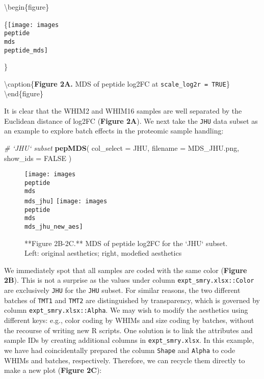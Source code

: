\documentclass[]{article}
\newenvironment{Shaded}{\begin{snugshade}}{\end{snugshade}}
\newcommand{\CommentTok}[1]{\textcolor[rgb]{0.56,0.35,0.01}{\textit{#1}}}
\newcommand{\DataTypeTok}[1]{\textcolor[rgb]{0.13,0.29,0.53}{#1}}
\newcommand{\KeywordTok}[1]{\textcolor[rgb]{0.13,0.29,0.53}{\textbf{#1}}}
\newcommand{\NormalTok}[1]{#1}
\newcommand{\OtherTok}[1]{\textcolor[rgb]{0.56,0.35,0.01}{#1}}
\begin{document}
\textbackslash{}begin\{figure\}

\{\centering \texttt{[image: images\\peptide\\mds\\peptide\_mds]}

\}

\textbackslash{}caption\{\textbf{Figure 2A.} MDS of peptide log2FC at
\texttt{scale\_log2r\ =\ TRUE}\}\label{fig:Peptide_MDS}
\textbackslash{}end\{figure\}

It is clear that the WHIM2 and WHIM16 samples are well separated by the
Euclidean distance of log2FC (\textbf{Figure 2A}). We next take the
\texttt{JHU} data subset as an example to explore batch effects in the
proteomic sample handling:

\begin{Shaded}
\begin{Highlighting}[]
\CommentTok{# `JHU` subset}
\KeywordTok{pepMDS}\NormalTok{(}
  \DataTypeTok{col_select =}\NormalTok{ JHU,}
  \DataTypeTok{filename =}\NormalTok{ MDS_JHU.png,}
  \DataTypeTok{show_ids =} \OtherTok{FALSE}
\NormalTok{)}
\end{Highlighting}
\end{Shaded}

\begin{figure}

{\centering \texttt{[image: images\\peptide\\mds\\mds\_jhu]} \texttt{[image: images\\peptide\\mds\\mds\_jhu\_new\_aes]} 

}

\caption{**Figure 2B-2C.** MDS of peptide log2FC for the `JHU` subset. Left: original aesthetics; right, modefied aesthetics}\label{fig:Peptide_JHU_MDS}
\end{figure}

We immediately spot that all samples are coded with the same color
(\textbf{Figure 2B}). This is not a surprise as the values under column
\texttt{expt\_smry.xlsx::Color} are exclusively \texttt{JHU} for the
\texttt{JHU} subset. For similar reasons, the two different batches of
\texttt{TMT1} and \texttt{TMT2} are distinguished by transparency, which
is governed by column \texttt{expt\_smry.xlsx::Alpha}. We may wish to
modify the aesthetics using different keys: e.g., color coding by WHIMs
and size coding by batches, without the recourse of writing new R
scripts. One solution is to link the attributes and sample IDs by
creating additional columns in \texttt{expt\_smry.xlsx}. In this
example, we have had coincidentally prepared the column \texttt{Shape}
and \texttt{Alpha} to code WHIMs and batches, respectively. Therefore,
we can recycle them directly to make a new plot (\textbf{Figure 2C}):
\end{document}
